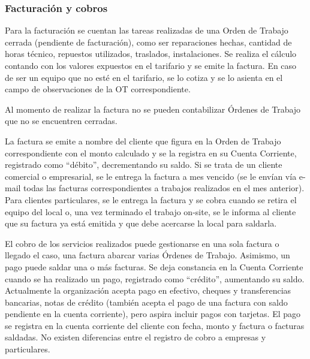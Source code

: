 \documentclass[12pt]{extarticle}
\begin{document}
\begin{spacing}{1.2}
        \subsubsection{Facturación y cobros}
        Para la facturación se cuentan las tareas realizadas de una Orden de Trabajo cerrada (pendiente de facturación), como ser reparaciones hechas, cantidad de horas técnico, repuestos utilizados, traslados, instalaciones. Se realiza el cálculo contando con los valores expuestos en el tarifario y se emite la factura. En caso de ser un equipo que no esté en el tarifario, se lo cotiza y se lo asienta en el campo de observaciones de la OT correspondiente.

        Al momento de realizar la factura no se pueden contabilizar Órdenes de Trabajo que no se encuentren cerradas.

        La factura se emite a nombre del cliente que figura en la Orden de Trabajo correspondiente con el monto calculado y se la registra en su Cuenta Corriente, registrado como ``débito'', decrementando su saldo. Si se trata de un cliente comercial o empresarial, se le entrega la factura a mes vencido (se le envían vía e-mail todas las facturas correspondientes a trabajos realizados en el mes anterior). Para clientes particulares, se le entrega la factura y se cobra cuando se retira el equipo del local o, una vez terminado el trabajo on-site, se le informa al cliente que su factura ya está emitida y que debe acercarse la local para saldarla.

        El cobro de los servicios realizados puede gestionarse en una sola factura o llegado el caso, una factura abarcar varias Órdenes de Trabajo. Asimismo, un pago puede saldar una o más facturas. Se deja constancia en la Cuenta Corriente cuando se ha realizado un pago, registrado como ``crédito'', aumentando su saldo. Actualmente la organización acepta pago en efectivo, cheques y transferencias bancarias, notas de crédito (también acepta el pago de una factura con saldo pendiente en la cuenta corriente), pero aspira incluir pagos con tarjetas. El pago se registra en la cuenta corriente del cliente con fecha, monto y factura o facturas saldadas. No existen diferencias entre el registro de cobro a empresas y particulares.\\


\end{spacing}
\end{document}
